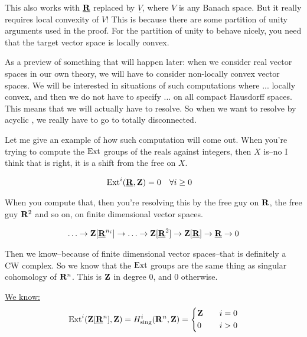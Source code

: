 This also works with $\underline{\mathbf R}$ replaced by $\underline{V}$, where $V$ is any Banach space. But it really requires local convexity of $V$! This is because there are some partition of unity arguments used in the proof. For the partition of unity to behave nicely, you need that the target vector space is locally convex.

As a preview of something that will happen later: when we consider real vector spaces in our own theory, we will have to consider non-locally convex vector spaces. We will be interested in situations of such computations where ...  locally convex, and then we do not have to specify ...  on all compact Hausdorff spaces. This means that we will actually have to resolve. So when we want to resolve by acyclic , we really have to go to totally disconnected.

Let me give an example of how such computation will come out. When you're trying to compute the $\operatorname{Ext}$ groups of the reals against integers, then $X$ is--no I think that is right, it is a shift from the free on $X$.

\begin{example}
\begin{align*}
\operatorname{Ext}^i (\underline{\mathbf R}, \mathbf Z) = 0 \quad & \forall i \geq 0
\end{align*}
\end{example}


When you compute that, then you're resolving this by the free guy on $\mathbf R$, the free guy $\mathbf R^2$ and so on, on finite dimensional vector spaces. 

\label{sequence:04-resolution}
\begin{align*} 
\ldots \to \mathbf Z[\underline{\mathbf R}^{n_i}] \to \ldots \to \mathbf Z[\underline{\mathbf R}^2] \to \mathbf Z[\underline{\mathbf R}] \to \underline{\mathbf R} \to 0
\end{align*}

Then we know--because of finite dimensional vector spaces--that is definitely a CW complex. So we know that the $\operatorname{Ext}$ groups are the same thing as singular cohomology of $\mathbf R^n$. This is $\mathbf Z$ in degree $0$, and $0$ otherwise.

\underline{We know:}
\begin{align*}
\operatorname{Ext}^i(\mathbf Z[\underline{\mathbf R}^n], \mathbf Z) = H^i_{\mathrm{sing}}(\mathbf R^n,\mathbf Z) = 
\left\{
    \begin{aligned}
         & \mathbf Z \quad & i = 0 \\
         & 0 \quad & i > 0 \\
    \end{aligned}
\right.
\end{align*}

